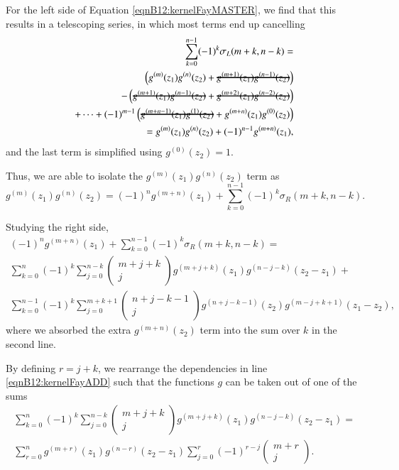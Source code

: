 For the left side of Equation \ref{eqnB12:kernelFayMASTER}, we find that this results in a telescoping series, in which most terms end up cancelling
\begin{align}
    \sum_{k=0}^{n-1} (-1)^k \sigma_L(m+k,n-k) = \\
    \left(g^{(m)}(z_1)g^{(n)}(z_2)+\hcancel{g^{(m+1)}(z_1)g^{(n-1)}(z_2)}\right) \\
    - \left(\hcancel{g^{(m+1)}(z_1)g^{(n-1)}(z_2)}+\hcancel{g^{(m+2)}(z_1)g^{(n-2)}(z_2)}\right) \\
    + \cdots + (-1)^{m-1} \left(\hcancel{g^{(m+n-1)}(z_1)g^{(1)}(z_2)}+g^{(m+n)}(z_1)g^{(0)}(z_2)\right) \\
    = g^{(m)}(z_1)g^{(n)}(z_2) + (-1)^{n-1} g^{(m+n)}(z_1),
\end{align}
and the last term is simplified using $g^{(0)}(z_2)=1$.

Thus, we are able to isolate the $g^{(m)}(z_1)g^{(n)}(z_2)$ term as
\begin{equation}
    g^{(m)}(z_1)g^{(n)}(z_2) = (-1)^n g^{(m+n)}(z_1) + \sum_{k=0}^{n-1} (-1)^k \sigma_R(m+k,n-k).
\end{equation}

Studying the right side,
\begin{align}
    (-1)^n g^{(m+n)}(z_1) + \sum_{k=0}^{n-1} (-1)^k \sigma_R(m+k,n-k) = \\
    \sum_{k=0}^{n} (-1)^k \sum_{j=0}^{n-k} \begin{pmatrix} m+j+k \\ j \end{pmatrix} g^{(m+j+k)}(z_1) g^{(n-j-k)}(z_2-z_1) + \label{eqnB12:kernelFayADD} \\
    \sum_{k=0}^{n-1} (-1)^k \sum_{j=0}^{m+k+1} \begin{pmatrix} n+j-k-1 \\ j \end{pmatrix} g^{(n+j-k-1)}(z_2) g^{(m-j+k+1)}(z_1-z_2) \label{eqnB12:kernelFaySUB},
\end{align}
where we absorbed the extra $g^{(m+n)}(z_2)$ term into the sum over $k$ in the second line.

By defining $r=j+k$, we rearrange the dependencies in line \ref{eqnB12:kernelFayADD} such that the functions $g$ can be taken out of one of the sums
\begin{align}
    \sum_{k=0}^{n} (-1)^k \sum_{j=0}^{n-k} \begin{pmatrix} m+j+k \\ j \end{pmatrix} g^{(m+j+k)}(z_1) g^{(n-j-k)}(z_2-z_1) = \\
    \sum_{r=0}^{n} g^{(m+r)}(z_1) g^{(n-r)}(z_2-z_1) \sum_{j=0}^{r} (-1)^{r-j} \begin{pmatrix} m+r \\ j \end{pmatrix}.
\end{align}

